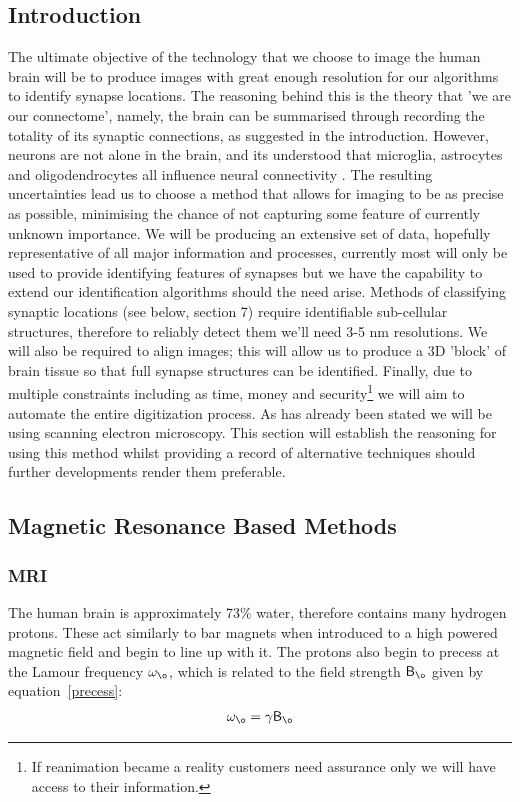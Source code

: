 \documentclass[a4paper, 11pt]{article}
\numberwithin{equation}{section}
\begin{document}
\subsection{Introduction}
The ultimate objective of the technology that we choose to image the human brain will be to produce images with great enough resolution for our algorithms to identify synapse locations. The reasoning behind this is the theory that 'we are our connectome'\cite{seung2013connectome}, namely, the brain can be summarised through recording the totality of its synaptic connections, as suggested in the introduction. However, neurons are not alone in the brain, and its understood that microglia, astrocytes and oligodendrocytes all influence neural connectivity \cite{fields2015glial}. The resulting uncertainties lead us to choose a method that allows for imaging to be as precise as possible, minimising the chance of not capturing some feature of currently unknown importance. We will be producing an extensive set of data, hopefully representative of all major information and processes, currently most will only be used to provide identifying features of synapses but we have the capability to extend our identification algorithms should the need arise. Methods of classifying synaptic locations (see below, section 7) require identifiable sub-cellular structures, therefore to reliably detect them we'll need 3-5 nm\cite{Briggman2012154}\cite{mikula2015high} resolutions. We will also be required to align images; this will allow us to produce a 3D 'block' of brain tissue so that full synapse structures can be identified. Finally, due to multiple constraints including as time, money and security\footnote{If reanimation became a reality customers need assurance only we will have access to their information.} we  will aim to automate the entire digitization process. As has already been stated we will be using scanning electron microscopy. This section will establish the reasoning for using this method whilst providing a record of alternative techniques should further developments render them preferable. 

\subsection{Magnetic Resonance Based Methods}
\subsubsection{MRI}
The human brain is approximately 73\% water\cite{mitchell1945chemical}, therefore contains many hydrogen protons. These act similarly to bar magnets when introduced to a high powered magnetic field and begin to line up with it. The protons also begin to precess at the Lamour frequency $\omega_{\o}$, which is related to the field strength $\mathsf{B}_{\o}$ given by equation~\eqref{precess}:
\begin{align}\label{precess}
	\omega_{\o}=\gamma\mathsf{B}_{\o}
\end{align}
\end{document}
